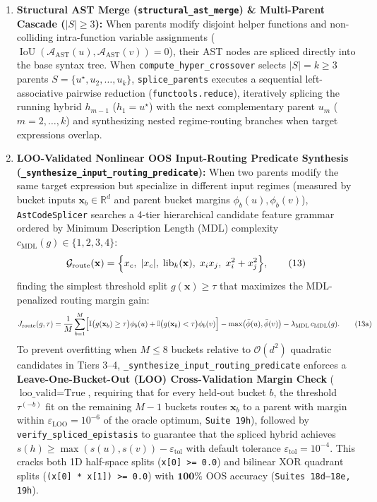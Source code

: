 \documentclass[11pt,a4paper]{article}
\begin{document}
\begin{enumerate}
\item \textbf{Structural AST Merge (\texttt{structural\_ast\_merge}) \& Multi-Parent Cascade ($|S| \ge 3$):} When parents modify disjoint helper functions and non-colliding intra-function variable assignments ($\operatorname{IoU}(\mathcal{A}_{\text{AST}}(u), \mathcal{A}_{\text{AST}}(v)) = 0$), their AST nodes are spliced directly into the base syntax tree. When \texttt{compute\_hyper\_crossover} selects $|S| = k \ge 3$ parents $S = \{u^\star, u_2, \dots, u_k\}$, \texttt{splice\_parents} executes a sequential left-associative pairwise reduction (\texttt{functools.reduce}), iteratively splicing the running hybrid $h_{m-1}$ ($h_1 = u^\star$) with the next complementary parent $u_m$ ($m = 2, \dots, k$) and synthesizing nested regime-routing branches when target expressions overlap.
\item \textbf{LOO-Validated Nonlinear OOS Input-Routing Predicate Synthesis (\texttt{\_synthesize\_input\_routing\_predicate}):} When two parents modify the same target expression but specialize in different input regimes (measured by bucket inputs $\mathbf{x}_b \in \mathbb{R}^d$ and parent bucket margins $\phi_b(u), \phi_b(v)$), \texttt{AstCodeSplicer} searches a 4-tier hierarchical candidate feature grammar ordered by Minimum Description Length (MDL) complexity $c_{\text{MDL}}(g) \in \{1, 2, 3, 4\}$:
\begin{equation}
\mathcal{G}_{\text{route}}(\mathbf{x}) = \Bigl\{x_c,\; |x_c|,\; \operatorname{lib}_k(\mathbf{x}),\; x_i x_j,\; x_i^2 + x_j^2\Bigr\},
\tag{13}\label{eq:g_route}
\end{equation}
finding the simplest threshold split $g(\mathbf{x}) \ge \tau$ that maximizes the MDL-penalized routing margin gain:
\begin{equation}
J_{\text{route}}(g, \tau) = \frac{1}{M}\sum_{b=1}^M \Bigl[\mathbb{I}\bigl(g(\mathbf{x}_b) \ge \tau\bigr)\phi_b(u) + \mathbb{I}\bigl(g(\mathbf{x}_b) < \tau\bigr)\phi_b(v)\Bigr] - \max\bigl(\bar{\phi}(u), \bar{\phi}(v)\bigr) - \lambda_{\text{MDL}}\,c_{\text{MDL}}(g).
\tag{13a}\label{eq:j_route}
\end{equation}
To prevent overfitting when $M \le 8$ buckets relative to $\mathcal{O}(d^2)$ quadratic candidates in Tiers 3--4, \texttt{\_synthesize\_input\_routing\_predicate} enforces a \textbf{Leave-One-Bucket-Out (LOO) Cross-Validation Margin Check} ($\text{loo\_valid} = \text{True}$, requiring that for every held-out bucket $b$, the threshold $\tau^{(-b)}$ fit on the remaining $M-1$ buckets routes $\mathbf{x}_b$ to a parent with margin within $\varepsilon_{\text{LOO}} = 10^{-6}$ of the oracle optimum, \texttt{Suite 19h}), followed by \texttt{verify\_spliced\_epistasis} to guarantee that the spliced hybrid achieves $s(h) \ge \max(s(u), s(v)) - \varepsilon_{\text{tol}}$ with default tolerance $\varepsilon_{\text{tol}} = 10^{-4}$. This cracks both 1D half-space splits (\texttt{x[0] >= 0.0}) and bilinear XOR quadrant splits (\texttt{(x[0] * x[1]) >= 0.0}) with $\mathbf{100\%}$ OOS accuracy (\texttt{Suites 18d--18e, 19h}).
\end{enumerate}
\end{document}
